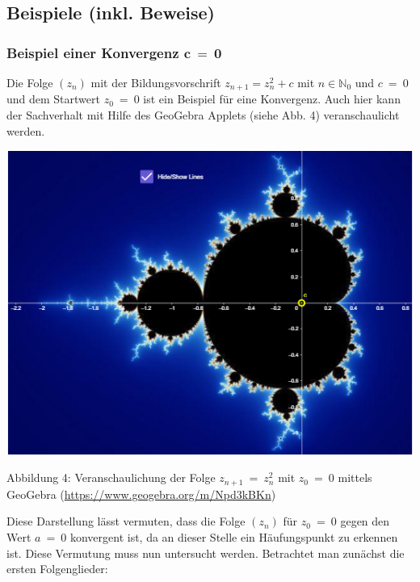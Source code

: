 \documentclass[a4paper, 12pt]{book}
\begin{document}
\hypertarget{beispiele-inkl.-beweise}{%
\subsection{\texorpdfstring{Beispiele (inkl. Beweise)
}{Beispiele (inkl. Beweise) }}\label{beispiele-inkl.-beweise}}

\hypertarget{beispiel-einer-konvergenz-mathbfc-0}{%
\subsubsection{\texorpdfstring{Beispiel einer Konvergenz
\(\mathbf{c\  = \ 0}\)}{Beispiel einer Konvergenz \textbackslash mathbf\{c\textbackslash{}  = \textbackslash{} 0\}}}\label{beispiel-einer-konvergenz-mathbfc-0}}

Die Folge \(\left( z_{n} \right)\) mit der Bildungsvorschrift
\(z_{n + 1} = z_{n}^{2} + c\) mit \(n \in \mathbb{N}_{0}\) und
\(c\  = \ 0\) und dem Startwert \(z_{0}\  = \ 0\) ist ein Beispiel für
eine Konvergenz. Auch hier kann der Sachverhalt mit Hilfe des GeoGebra
Applets (siehe Abb. 4) veranschaulicht werden.

\includegraphics[width=\linewidth]{image9.png}

\protect\hypertarget{_Toc167901654}{}{}Abbildung 4: Veranschaulichung
der Folge \(z_{n + 1}\  = \ z_{n}^{2}\) mit \(z_{0}\  = \ 0\) mittels
GeoGebra (\url{https://www.geogebra.org/m/Npd3kBKn})

Diese Darstellung lässt vermuten, dass die Folge
\(\left( z_{n} \right)\) für \(z_{0}\  = \ 0\) gegen den Wert
\(a\  = \ 0\) konvergent ist, da an dieser Stelle ein Häufungspunkt zu
erkennen ist. Diese Vermutung muss nun untersucht werden. Betrachtet man
zunächst die ersten Folgenglieder:
\end{document}
